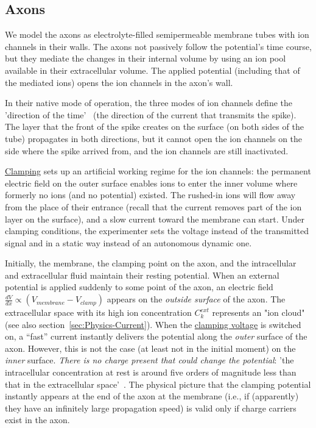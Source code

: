 \subsection{Axons\label{sec:Physiology-Axon}}

We model the axons as electrolyte-filled semipermeable membrane tubes with ion channels in their walls. The axons not passively follow the potential's time course, but they
mediate the changes in their internal volume by using an ion pool
available in their extracellular volume. The applied potential (including that of the mediated ions) opens the
ion channels in the axon's wall. 

In their native mode of operation, the three modes of ion channels define the 'direction of the time'~\cite{ThreeStateUnidirectional:2004, MarkovianIonChannel:2005,RoleOfInformationTransferSpeed:2022} (the direction of 
the current that transmits the spike). The layer that the 
front of the spike creates on the surface (on both sides
of the tube) propagates in both directions, 
but it cannot open the ion channels on the side where
the spike arrived from, and the ion channels are still
inactivated.

\hyperlink{voltage-clamping}{Clamping}
sets up an artificial working regime for the ion channels: the permanent
electric field on the outer surface enables ions to enter the inner volume where
formerly no ions (and no potential) existed. The rushed-in ions will
flow away from the place of their entrance (recall that the current removes part of the ion layer on the surface), and a slow current toward the membrane can start. 
Under clamping conditions, the experimenter sets the voltage instead of the transmitted signal and in a static way instead of an  autonomous dynamic one.

Initially, the membrane, the clamping point on the
axon, and the intracellular and extracellular fluid maintain
their resting potential. When an external potential 
is applied  suddenly to some point of the axon, an electric field $\frac{dV}{dx}\propto(V_{membrane}-V_{clamp})$
appears on the \emph{outside surface} of the axon. The extracellular
space with its high ion concentration $C_{k}^{ext}$ represents an "ion
cloud" (see also section~\ref{sec:Physics-Current}). When the \hyperlink{voltage-clamping}{clamping voltage} is switched on, a ``fast'' current
instantly delivers the potential along the \emph{outer} surface of
the axon. However, this is not the case (at least not in the initial
moment) on the \emph{inner} surface. \textit{There is no charge present that could
change the potential}: 'the intracellular concentration at rest is around
five orders of magnitude less than that in the extracellular space'~\cite{KochBiophysics:1999}. The physical picture that the clamping potential
instantly appears at the end of the axon at the membrane (i.e., if (apparently) they
have an infinitely large propagation speed) is valid
only if charge carriers exist in the axon.


